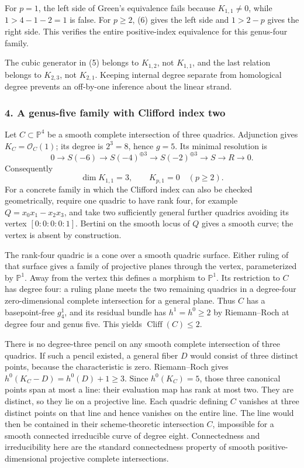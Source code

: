 \documentclass[11pt]{article}
\begin{document}
For $p=1$, the left side of Green's equivalence fails because $K_{1,1}\ne0$, while $1>4-1-2=1$ is false. For $p\ge2$, (6) gives the left side and $1>2-p$ gives the right side. This verifies the entire positive-index equivalence for this genus-four family.

The cubic generator in (5) belongs to $K_{1,2}$, not $K_{1,1}$, and the last relation belongs to $K_{2,3}$, not $K_{2,1}$. Keeping internal degree separate from homological degree prevents an off-by-one inference about the linear strand.

\subsubsection{4. A genus-five family with Clifford index two}
Let $C\subset\mathbb P^4$ be a smooth complete intersection of three quadrics. Adjunction gives $K_C=\mathcal O_C(1)$; its degree is $2^3=8$, hence $g=5$. Its minimal resolution is
\[
0\to S(-6)\to S(-4)^{\oplus3}\to S(-2)^{\oplus3}
 \to S\to R\to0.                                    \tag{7}
\]
Consequently
\[
 \dim K_{1,1}=3,\qquad K_{p,1}=0\quad(p\ge2).         \tag{8}
\]
For a concrete family in which the Clifford index can also be checked geometrically, require one quadric to have rank four, for example
$Q=x_0x_1-x_2x_3$, and take two sufficiently general further quadrics avoiding its vertex $[0:0:0:0:1]$. Bertini on the smooth locus of $Q$ gives a smooth curve; the vertex is absent by construction.

The rank-four quadric is a cone over a smooth quadric surface. Either ruling of that surface gives a family of projective planes through the vertex, parameterized by $\mathbb P^1$. Away from the vertex this defines a morphism to $\mathbb P^1$. Its restriction to $C$ has degree four: a ruling plane meets the two remaining quadrics in a degree-four zero-dimensional complete intersection for a general plane. Thus $C$ has a basepoint-free $g^1_4$, and its residual bundle has $h^1=h^0\ge2$ by Riemann--Roch at degree four and genus five. This yields $\operatorname{Cliff}(C)\le2$.

There is no degree-three pencil on any smooth complete intersection of three quadrics. If such a pencil existed, a general fiber $D$ would consist of three distinct points, because the characteristic is zero. Riemann--Roch gives
$h^0(K_C-D)=h^0(D)+1\ge3$. Since $h^0(K_C)=5$, those three canonical points span at most a line: their evaluation map has rank at most two. They are distinct, so they lie on a projective line. Each quadric defining $C$ vanishes at three distinct points on that line and hence vanishes on the entire line. The line would then be contained in their scheme-theoretic intersection $C$, impossible for a smooth connected irreducible curve of degree eight. Connectedness and irreducibility here are the standard connectedness property of smooth positive-dimensional projective complete intersections.
\end{document}

